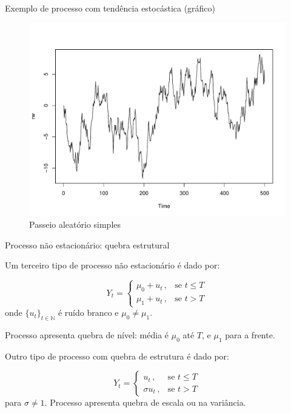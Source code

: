 \documentclass[11pt]{beamer}
\newenvironment{halfwideitemize}{\itemize\addtolength{\itemsep}{0.5em}}{\enditemize}
\begin{document}
\begin{frame}{Exemplo de processo com tendência estocástica (gráfico)}
	\begin{figure}
		\caption{Passeio aleatório simples}
		\includegraphics[scale=0.4]{graficos/rw.pdf}
	\end{figure}
\end{frame}
\begin{frame}{Processo não estacionário: quebra estrutural}
	\begin{halfwideitemize}
		\item Um terceiro tipo de processo não estacionário é dado por:
		
		\begin{equation}
			\label{break_mean}
				Y_t = \begin{cases}
					\mu_0 + u_t \, ,& \text{se } t \leq T \, \\
					\mu_1 + u_t \, , & \text{se } t > T \, 
				\end{cases}
		\end{equation}
		onde $\{u_t\}_{t \in \mathbb{N}}$ é ruído branco e $\mu_0 \neq \mu_1$.
		\item Processo apresenta quebra de {\color{blue}nível}: média é $\mu_0$ até $T$, e $\mu_1$ para a frente.
		
		\item Outro tipo de processo com {\color{blue}quebra de estrutura} é dado por:
		
				\begin{equation}
			Y_t = \begin{cases}
				 u_t \, ,& \text{se } t \leq T \, \\
				\sigma u_t \, , & \text{se } t > T \, 
			\end{cases}
		\end{equation}
		para $\sigma \neq 1$. Processo apresenta {\color{blue}quebra de escala ou na variância}.
	\end{halfwideitemize}
\end{frame}
\end{document}
